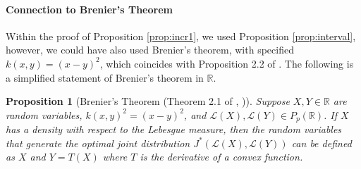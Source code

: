 \documentclass[12pt]{article}
\theoremstyle{plain}%
\newtheorem{theorem}{Theorem}[section]
\newtheorem{prop}[theorem]{Proposition}
\theoremstyle{definition}
\begin{document}
%
%	
%	
%	


\paragraph{Connection to Brenier's Theorem}\label{prop:brenier}
Within the proof of Proposition \ref{prop:incr1}, we used Proposition \ref{prop:interval}, however, we could have also used Brenier's theorem, with specified $k(x,y)=(x-y)^2$, which coincides with Proposition 2.2 of \cite{crn}. The following is a simplified statement of Brenier's theorem in $\mathbb{R}$.
\begin{prop}[Brenier's Theorem (Theorem 2.1 of \cite{cuturi}, \cite{brenier})]
	Suppose $X,Y\in \mathbb{R}$ are random variables, $k(x,y)^2=(x-y)^2$, and $\mathcal{L}(X),\mathcal{L}(Y)\in P_p(\mathbb{R})$. If $X$ has a density with respect to the Lebesgue measure, then the random variables that generate the optimal joint distribution $J^*(\mathcal{L}(X),\mathcal{L}(Y))$ can be defined as $X$ and $Y=T(X)$ where $T$ is the derivative of a convex function.
\end{prop}
\end{document}

